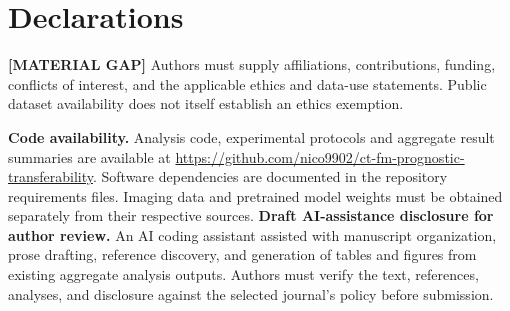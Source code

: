 \documentclass[11pt,a4paper]{article}
\newcommand{\gap}[1]{\par\smallskip\noindent\textcolor{red!65!black}{\textbf{[MATERIAL GAP]} #1}\par\smallskip}
\begin{document}





\section*{Declarations}
\gap{Authors must supply affiliations, contributions, funding, conflicts of interest, and the applicable ethics and data-use statements. Public dataset availability does not itself establish an ethics exemption.}
\noindent\textbf{Code availability.} Analysis code, experimental protocols and aggregate result summaries are available at \url{https://github.com/nico9902/ct-fm-prognostic-transferability}. Software dependencies are documented in the repository requirements files. Imaging data and pretrained model weights must be obtained separately from their respective sources.
\noindent\textbf{Draft AI-assistance disclosure for author review.} An AI coding assistant assisted with manuscript organization, prose drafting, reference discovery, and generation of tables and figures from existing aggregate analysis outputs. Authors must verify the text, references, analyses, and disclosure against the selected journal's policy before submission.


\clearpage

\end{document}
